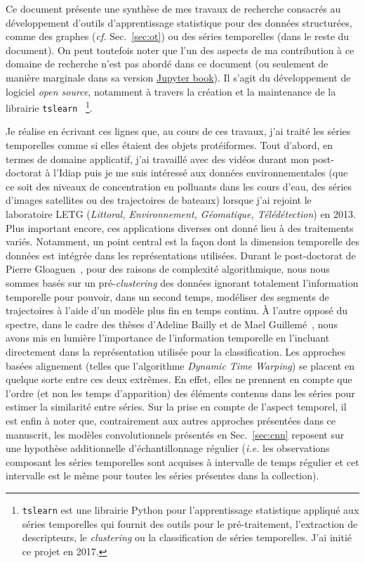Ce document présente une synthèse de mes travaux de recherche consacrés au
développement d'outils d'apprentissage statistique pour des données structurées,
comme des graphes (\emph{cf.} Sec.~\ref{sec:ot}) ou des séries temporelles
(dans le reste du document).
On peut toutefois noter que l'un des aspects de ma contribution à ce domaine de
recherche n'est pas abordé dans ce document (ou seulement de manière marginale
dans sa version
\href{https://rtavenar.github.io/hdr/}{Jupyter book}). Il s'agit du
développement de logiciel \emph{open source}, notamment à travers la création
et la maintenance de la librairie \texttt{tslearn}~\cite{tslearn}%
\footnote{\texttt{tslearn} est une librairie Python pour l'apprentissage
statistique appliqué aux séries temporelles qui fournit des outils pour le
pré-traitement, l'extraction de descripteurs, le \emph{clustering} ou la
classification de séries temporelles. J'ai initié ce projet en 2017.}.

Je réalise en écrivant ces lignes que, au cours de ces travaux, j'ai traité les
séries temporelles comme si elles étaient des objets protéiformes.
Tout d'abord, en termes de domaine applicatif, j'ai travaillé avec des vidéos
durant mon post-doctorat à l'Idiap puis je me suis intéressé aux données
environnementales (que ce soit des niveaux de concentration en polluants dans
les cours d'eau, des séries d'images satellites ou des trajectoires de bateaux)
lorsque j'ai rejoint le laboratoire LETG (\emph{Littoral, Environnement,
Géomatique, Télédétection}) en 2013.
Plus important encore, ces applications diverses ont donné lieu à des
traitements variés.
Notamment, un point central est la façon dont la dimension temporelle des
données est intégrée dans les représentations utilisées.
Durant le post-doctorat de Pierre Gloaguen~\cite{gloaguen2020}, pour des raisons
de complexité algorithmique, nous nous sommes basés sur un pré-\emph{clustering}
des données ignorant totalement l'information temporelle pour pouvoir, dans un
second temps, modéliser des segments de trajectoires à l'aide d'un modèle plus
fin en temps continu.
À l'autre opposé du spectre, dans le cadre des thèses d'Adeline Bailly et de
Mael Guillemé~\cite{guilleme:hal-02513295,tavenard:halshs-01561461},
nous avons mis en lumière l'importance de l'information temporelle en l'incluant
directement dans la représentation utilisée pour la classification.
Les approches basées alignement (telles que l'algorithme
\emph{Dynamic Time Warping})
se placent en quelque sorte entre ces deux extrêmes.
En effet, elles ne prennent en compte que l'ordre (et non les temps
d'apparition) des éléments contenus dans les séries pour estimer la
similarité entre séries.
Sur la prise en compte de l'aspect temporel, il est enfin à noter que,
contrairement aux autres approches présentées dans ce manuscrit, les modèles
convolutionnels présentés en Sec.~\ref{sec:cnn} reposent sur une hypothèse
additionnelle d'échantillonnage régulier (\emph{i.e.}
les observations composant les séries temporelles sont acquises à intervalle de
temps régulier et cet intervalle est le même pour toutes les séries présentes
dans la collection).

